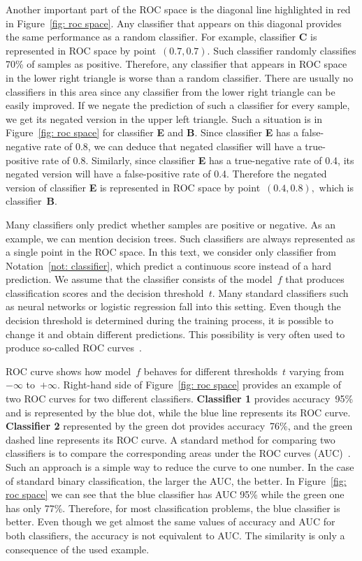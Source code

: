 Another important part of the ROC space is the diagonal line highlighted in red in Figure~\ref{fig: roc space}. Any classifier that appears on this diagonal provides the same performance as a random classifier. For example, classifier \textbf{C} is represented in ROC space by point~$(0.7, 0.7).$ Such classifier randomly classifies 70\% of samples as positive. Therefore, any classifier that appears in ROC space in the lower right triangle is worse than a random classifier. There are usually no classifiers in this area since any classifier from the lower right triangle can be easily improved. If we negate the prediction of such a classifier for every sample, we get its negated version in the upper left triangle. Such a situation is in Figure~\ref{fig: roc space} for classifier \textbf{E} and \textbf{B}. Since classifier \textbf{E} has a false-negative rate of 0.8, we can deduce that negated classifier will have a true-positive rate of 0.8. Similarly, since classifier \textbf{E} has a true-negative rate of 0.4, its negated version will have a false-positive rate of 0.4. Therefore the negated version of classifier \textbf{E} is represented in ROC space by point~$(0.4, 0.8),$ which is classifier~\textbf{B}.

Many classifiers only predict whether samples are positive or negative. As an example, we can mention decision trees. Such classifiers are always represented as a single point in the ROC space. In this text, we consider only classifier from Notation~\ref{not: classifier}, which predict a continuous score instead of a hard prediction. We assume that the classifier consists of the model~$f$ that produces classification scores and the decision threshold~$t.$ Many standard classifiers such as neural networks or logistic regression fall into this setting. Even though the decision threshold is determined during the training process, it is possible to change it and obtain different predictions. This possibility is very often used to produce so-called ROC curves~\cite{fawcett2006introduction}.

ROC curve shows how model~$f$ behaves for different thresholds~$t$ varying from~$-\infty$ to~$+\infty.$ Right-hand side of Figure~\ref{fig: roc space} provides an example of two ROC curves for two different classifiers. \textbf{Classifier 1} provides accuracy~95\% and is represented by the blue dot, while the blue line represents its ROC curve. \textbf{Classifier 2} represented by the green dot provides accuracy~76\%, and the green dashed line represents its ROC curve. A standard method for comparing two classifiers is to compare the corresponding areas under the ROC curves (AUC)~\cite{bradley1997use, hanley1982meaning}. Such an approach is a simple way to reduce the curve to one number. In the case of standard binary classification, the larger the AUC, the better. In Figure~\ref{fig: roc space} we can see that the blue classifier has AUC 95\% while the green one has only 77\%. Therefore, for most classification problems, the blue classifier is better. Even though we get almost the same values of accuracy and AUC for both classifiers, the accuracy is not equivalent to AUC. The similarity is only a consequence of the used example.

